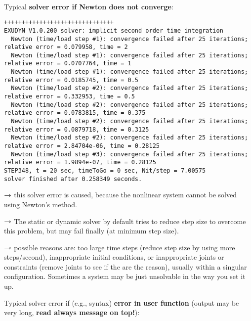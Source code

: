 \vspace{12pt}\\
  \item Typical {\bf solver error if Newton does not converge}:
	{\ttfamily \footnotesize
	\begin{lstlisting}[breaklines=true]
+++++++++++++++++++++++++++++++
EXUDYN V1.0.200 solver: implicit second order time integration
  Newton (time/load step #1): convergence failed after 25 iterations; relative error = 0.079958, time = 2
  Newton (time/load step #1): convergence failed after 25 iterations; relative error = 0.0707764, time = 1
  Newton (time/load step #1): convergence failed after 25 iterations; relative error = 0.0185745, time = 0.5
  Newton (time/load step #2): convergence failed after 25 iterations; relative error = 0.332953, time = 0.5
  Newton (time/load step #2): convergence failed after 25 iterations; relative error = 0.0783815, time = 0.375
  Newton (time/load step #2): convergence failed after 25 iterations; relative error = 0.0879718, time = 0.3125
  Newton (time/load step #2): convergence failed after 25 iterations; relative error = 2.84704e-06, time = 0.28125
  Newton (time/load step #3): convergence failed after 25 iterations; relative error = 1.9894e-07, time = 0.28125
STEP348, t = 20 sec, timeToGo = 0 sec, Nit/step = 7.00575
solver finished after 0.258349 seconds.
	\end{lstlisting}
	}
	\item[] $\rightarrow$ this solver error is caused, because the nonlinear system cannot be solved using Newton's method.
	\item[] $\rightarrow$ The static or dynamic solver by default tries to reduce step size to overcome this problem, but may fail finally (at minimum step size).
	\item[] $\rightarrow$ possible reasons are: too large time steps (reduce step size by using more steps/second), 
	inappropriate initial conditions, or inappropriate joints or constraints (remove joints to see if the are the reason),
	usually within a singular configuration.
	Sometimes a system may be just unsolvable in the way you set it up.
\vspace{12pt}\\
  \item Typical solver error if (e.g., syntax) {\bf error in user function} (output may be very long, {\bf read always message on top!}):

